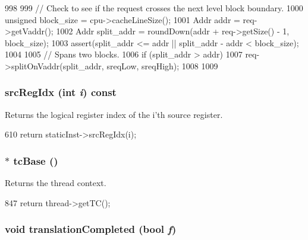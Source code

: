 \begin{DoxyCode}
998 {
999     // Check to see if the request crosses the next level block boundary.
1000     unsigned block_size = cpu->cacheLineSize();
1001     Addr addr = req->getVaddr();
1002     Addr split_addr = roundDown(addr + req->getSize() - 1, block_size);
1003     assert(split_addr <= addr || split_addr - addr < block_size);
1004 
1005     // Spans two blocks.
1006     if (split_addr > addr) {
1007         req->splitOnVaddr(split_addr, sreqLow, sreqHigh);
1008     }
1009 }
\end{DoxyCode}
\hypertarget{classBaseDynInst_a9353aea3dfe673b88a4a96163d58759f}{
\subsubsection[{srcRegIdx}]{ srcRegIdx (int {\em i}) const}}
\label{classBaseDynInst_a9353aea3dfe673b88a4a96163d58759f}
Returns the logical register index of the i'th source register. 


\begin{DoxyCode}
610 { return staticInst->srcRegIdx(i); }
\end{DoxyCode}
\hypertarget{classBaseDynInst_ad33756f3e96ee445dca8d69b1dd8709c}{
\subsubsection[{tcBase}]{$\ast$ tcBase ()}}
\label{classBaseDynInst_ad33756f3e96ee445dca8d69b1dd8709c}
Returns the thread context. 


\begin{DoxyCode}
847 { return thread->getTC(); }
\end{DoxyCode}
\hypertarget{classBaseDynInst_a650f554d6709582f30768a90e1b665cb}{
\subsubsection[{translationCompleted}]{\setlength{\rightskip}{0pt plus 5cm}void translationCompleted (bool {\em f})}}
\label{classBaseDynInst_a650f554d6709582f30768a90e1b665cb}



